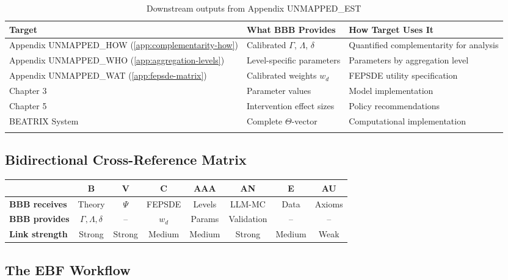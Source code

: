 \documentclass[11pt,a4paper]{article}
\theoremstyle{definition}
\begin{document}
\begin{longtable}{lp{4cm}p{6cm}}
\toprule
\textbf{Target} & \textbf{What BBB Provides} & \textbf{How Target Uses It} \\
\midrule
\endfirsthead
Appendix UNMAPPED_HOW (\ref{app:complementarity-how}) & Calibrated $\Gamma$, $\Lambda$, $\delta$ & Quantified complementarity for analysis \\
Appendix UNMAPPED_WHO (\ref{app:aggregation-levels}) & Level-specific parameters & Parameters by aggregation level \\
Appendix UNMAPPED_WAT (\ref{app:fepsde-matrix}) & Calibrated weights $w_d$ & FEPSDE utility specification \\
Chapter 3 & Parameter values & Model implementation \\
Chapter 5 & Intervention effect sizes & Policy recommendations \\
BEATRIX System & Complete $\Theta$-vector & Computational implementation \\
\bottomrule
\caption{Downstream outputs from Appendix UNMAPPED_EST}
\end{longtable}

\subsection{Bidirectional Cross-Reference Matrix}

\begin{center}
\small
\begin{tabular}{l|ccccccc}
\toprule
& \textbf{B} & \textbf{V} & \textbf{C} & \textbf{AAA} & \textbf{AN} & \textbf{E} & \textbf{AU} \\
\midrule
\textbf{BBB receives} & Theory & $\Psi$ & FEPSDE & Levels & LLM-MC & Data & Axioms \\
\textbf{BBB provides} & $\Gamma,\Lambda,\delta$ & -- & $w_d$ & Params & Validation & -- & -- \\
\midrule
\textbf{Link strength} & Strong & Strong & Medium & Medium & Strong & Medium & Weak \\
\bottomrule
\end{tabular}
\end{center}

\subsection{The EBF Workflow}

\begin{center}
\end{center}
\end{document}
